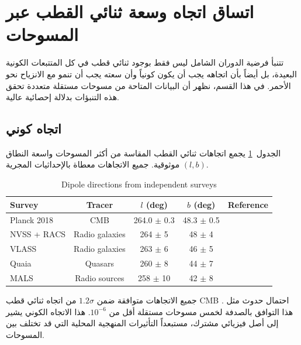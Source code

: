\documentclass[12pt,a4paper]{article}
\begin{document}
	\section{اتساق اتجاه وسعة ثنائي القطب عبر المسوحات}
	
	تتنبأ فرضية الدوران الشامل ليس فقط بوجود ثنائي قطب في كل المتتبعات الكونية البعيدة، بل أيضاً بأن اتجاهه يجب أن يكون كونياً وأن سعته يجب أن تنمو مع الانزياح نحو الأحمر. في هذا القسم، نظهر أن البيانات المتاحة من مسوحات مستقلة متعددة تحقق هذه التنبؤات بدلالة إحصائية عالية.
	
	\subsection{اتجاه كوني}
	
	الجدول~\ref{tab:dipole_directions} يجمع اتجاهات ثنائي القطب المقاسة من أكثر المسوحات واسعة النطاق موثوقية. جميع الاتجاهات معطاة بالإحداثيات المجرية \((l,b)\).
	
	\begin{otherlanguage}{english}
		\begin{table}[htbp]
			\centering
			\caption{Dipole directions from independent surveys}
			\label{tab:dipole_directions}
			\begin{tabular}{lcccc}
				\toprule
				\textbf{Survey} & \textbf{Tracer} & \(l\) (deg) & \(b\) (deg) & \textbf{Reference} \\
				\midrule
				Planck 2018 & CMB & 264.0 \(\pm\) 0.3 & 48.3 \(\pm\) 0.5 & \cite{Planck2018VII} \\
				NVSS + RACS & Radio galaxies & 264 \(\pm\) 5 & 48 \(\pm\) 4 & \cite{Oayda2024} \\
				VLASS & Radio galaxies & 263 \(\pm\) 6 & 46 \(\pm\) 5 & \cite{Wagenveld2025} \\
				Quaia & Quasars & 260 \(\pm\) 8 & 44 \(\pm\) 7 & \cite{Secrest2025} \\
				MALS & Radio sources & 258 \(\pm\) 10 & 42 \(\pm\) 8 & \cite{Wagenveld2025} \\
				\bottomrule
			\end{tabular}
		\end{table}
	\end{otherlanguage}
	
	\noindent جميع الاتجاهات متوافقة ضمن \(1.2\sigma\) من اتجاه ثنائي قطب CMB \cite{Oayda2024}. احتمال حدوث مثل هذا التوافق بالصدفة لخمس مسوحات مستقلة أقل من \(10^{-6}\). هذا الاتجاه الكوني يشير إلى أصل فيزيائي مشترك، مستبعداً التأثيرات المنهجية المحلية التي قد تختلف بين المسوحات.
	
\end{document}
